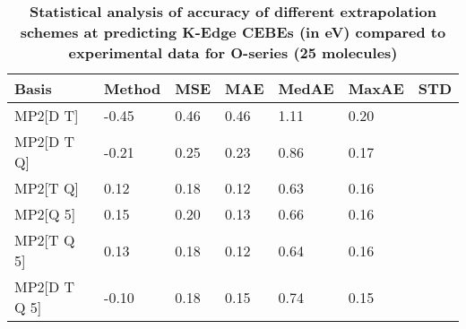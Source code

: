 \begin{table}
  \caption{\textbf{Statistical analysis of accuracy of different extrapolation schemes at predicting K-Edge CEBEs (in eV) compared to experimental data for O-series (25 molecules)}}
  \begin{tabular}{l l l l l l l }
    \toprule
    \textbf{Basis} & \textbf{Method} & \textbf{MSE} & \textbf{MAE} & \textbf{MedAE} & \textbf{MaxAE} & \textbf{STD} \\ 
    \midrule
    MP2[D T] & -0.45 & 0.46 & 0.46 & 1.11 & 0.20 \\ 
    MP2[D T Q] & -0.21 & 0.25 & 0.23 & 0.86 & 0.17 \\ 
    MP2[T Q] & 0.12 & 0.18 & 0.12 & 0.63 & 0.16 \\ 
    MP2[Q 5] & 0.15 & 0.20 & 0.13 & 0.66 & 0.16 \\ 
    MP2[T Q 5] & 0.13 & 0.18 & 0.12 & 0.64 & 0.16 \\ 
    MP2[D T Q 5] & -0.10 & 0.18 & 0.15 & 0.74 & 0.15 \\ 
    \bottomrule
  \end{tabular}
\end{table}
